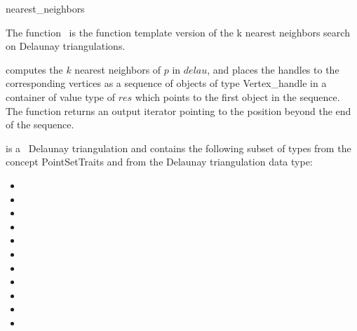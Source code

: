 
\begin{ccRefFunction}{nearest_neighbors}

\ccDefinition

The function \ccRefName\ is the function template version of the k nearest neighbors search on Delaunay
triangulations.


{computes the $k$ nearest neighbors of $p$ in $delau$, and places the
handles to the corresponding vertices as a sequence of objects of type
Vertex\_handle in a container of value type of $res$
which points to the first object in the sequence. The function
returns an output iterator pointing to the position beyond the end
of the sequence. }

 is a \cgal\ Delaunay triangulation and contains the following subset of types from the concept PointSetTraits and from
the Delaunay triangulation data type:
\begin{itemize}
  \item {}             
  \item {}                
  \item {}               
  \item {}            
  \item {}                      
  \item {}   
  \item {}                           
  \item {}                              
  \item {}                       
  \item {}                           
  \item {}    
\end{itemize}  
\end{ccRefFunction}
